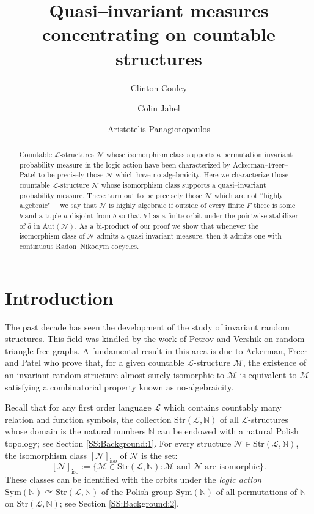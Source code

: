 \documentclass[11pt]{amsart}
\title{Quasi--invariant measures concentrating on countable structures}
\author{Clinton Conley}
\author{Colin Jahel}
\author{Aristotelis Panagiotopoulos}
\theoremstyle{plain}
\theoremstyle{definition}
\newcommand{\M}{\mathcal{M}}
\newcommand{\Ell}{\mathcal{L}}
\newcommand{\N}{\mathbb{N}}
\begin{document}
\begin{abstract}
Countable  $\mathcal{L}$-structures $\mathcal{N}$  whose isomorphism class supports a permutation invariant probability measure in the logic action have been characterized by  Ackerman--Freer--Patel to be precisely those  $\mathcal{N}$  which have no algebraicity. Here we characterize those countable $\mathcal{L}$-structure  $\mathcal{N}$  whose isomorphism class supports a  quasi--invariant probability measure. These turn out to be precisely those  $\mathcal{N}$ which are not ``highly algebraic" ---we say that  $\mathcal{N}$ is highly algebraic if outside of every finite $F$ there is some $b$ and  a tuple  $\bar{a}$ disjoint from $b$ so that $b$ has a finite orbit under the pointwise stabilizer of $\bar{a}$ in $\mathrm{Aut}(\mathcal{N})$.
As a bi-product of our proof we show that whenever the isomorphism class of $\mathcal{N}$ admits a  quasi-invariant measure, then it admits one with continuous   Radon--Nikodym cocycles. 
\end{abstract}


\maketitle

\section{Introduction}

The past decade has seen the development of the study of invariant random structures. This field was kindled by the work of Petrov and Vershik \cite{PV}   on random triangle-free graphs. A fundamental result in this area is due to Ackerman, Freer and Patel \cite{AFP} who prove that, for a given countable $\mathcal{L}$-structure $\M$,  the existence of an invariant random structure  almost surely isomorphic to $\M$ is equivalent to   $\M$  satisfying  a combinatorial property known as no-algebraicity. 

Recall that for any first order language $\mathcal{L}$ which  contains countably many  relation and function symbols, the collection $\mathrm{Str}(\Ell,\N)$ of all $\mathcal{L}$-structures whose domain is the natural numbers $\mathbb{N}$ can be endowed with a natural Polish topology; see Section \ref{SS:Background:1}. 
For every structure $\mathcal{N}\in \mathrm{Str}(\mathcal{L},\mathbb{N})$, the isomorphism class $[\mathcal{N}]_{\mathrm{iso}}$ of $\mathcal{N}$ is the set:
\[[\mathcal{N}]_{\mathrm{iso}}:=\{\mathcal{M}\in\mathrm{Str}(\mathcal{L},\mathbb{N}) \colon \mathcal{M} \text{ and } \mathcal{N}  \text{ are isomorphic}\}.\]
These  classes can be identified with the orbits under the \emph{logic action} $\mathrm{Sym}(\mathbb{N})\curvearrowright \mathrm{Str}(\mathcal{L},\mathbb{N})$  of the Polish group $\mathrm{Sym}(\mathbb{N})$  of all permutations of $\mathbb{N}$  on $\mathrm{Str}(\mathcal{L},\mathbb{N})$; see Section \ref{SS:Background:2}.
\end{document}
